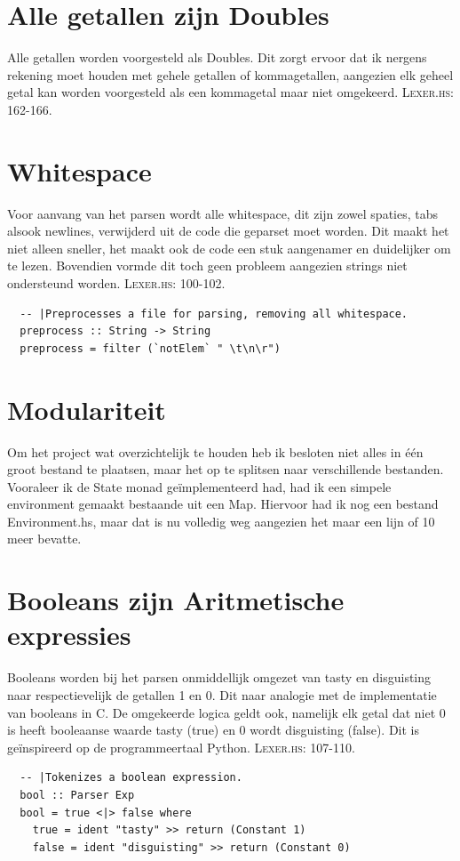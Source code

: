 \documentclass[12pt,a4paper]{report}
\begin{document}
\section{Alle getallen zijn Doubles}
Alle getallen worden voorgesteld als Doubles. Dit zorgt ervoor dat ik nergens rekening moet houden met gehele getallen of kommagetallen, aangezien elk geheel getal kan worden voorgesteld als een kommagetal maar niet omgekeerd. \textsc{Lexer.hs: 162-166.}
\section{Whitespace}
Voor aanvang van het parsen wordt alle whitespace, dit zijn zowel spaties, tabs alsook newlines, verwijderd uit de code die geparset moet worden. Dit maakt het niet alleen sneller, het maakt ook de code een stuk aangenamer en duidelijker om te lezen. Bovendien vormde dit toch geen probleem aangezien strings niet ondersteund worden. \textsc{Lexer.hs: 100-102.}
\begin{lstlisting}
  -- |Preprocesses a file for parsing, removing all whitespace.
  preprocess :: String -> String
  preprocess = filter (`notElem` " \t\n\r")
\end{lstlisting}
\section{Modulariteit}
Om het project wat overzichtelijk te houden heb ik besloten niet alles in één groot bestand te plaatsen, maar het op te splitsen naar verschillende bestanden. Vooraleer ik de State monad geïmplementeerd had, had ik een simpele environment gemaakt bestaande uit een Map. Hiervoor had ik nog een bestand Environment.hs, maar dat is nu volledig weg aangezien het maar een lijn of 10 meer bevatte.
\section{Booleans zijn Aritmetische expressies}
Booleans worden bij het parsen onmiddellijk omgezet van tasty en disguisting naar respectievelijk de getallen 1 en 0. Dit naar analogie met de implementatie van booleans in C. De omgekeerde logica geldt ook, namelijk elk getal dat niet 0 is heeft booleaanse waarde tasty (true) en 0 wordt disguisting (false). Dit is geïnspireerd op de programmeertaal Python. \textsc{Lexer.hs: 107-110.}
\begin{lstlisting}
  -- |Tokenizes a boolean expression.
  bool :: Parser Exp
  bool = true <|> false where
    true = ident "tasty" >> return (Constant 1)
    false = ident "disguisting" >> return (Constant 0)
\end{lstlisting}
\end{document}
